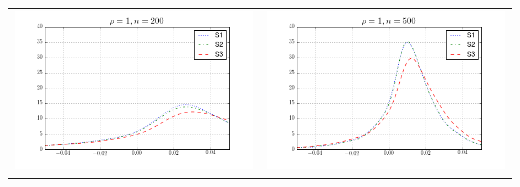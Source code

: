 \begin{table}[!ht]
{\begin{tabular}{c c}
\includegraphics[width=8cm]{beta1_density_200_1} & \includegraphics[width=8cm]{beta1_density_500_1} \\
\end{tabular}
}
\end{table}

